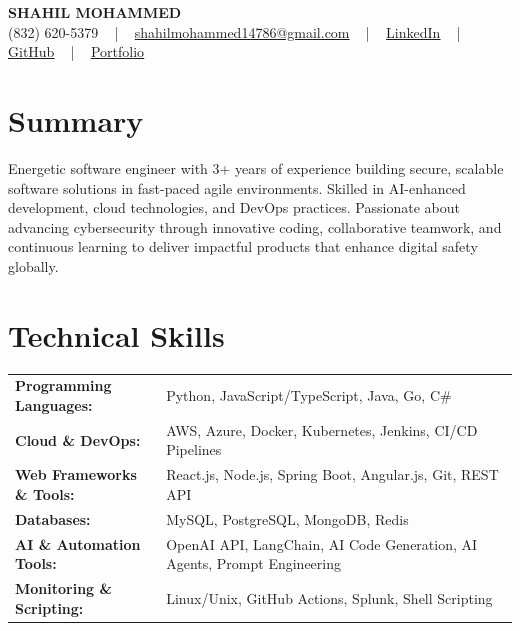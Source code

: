 \documentclass[letterpaper,11pt]{article}
\begin{document}
\begin{center}
    {\fontsize{14pt}{12pt}\selectfont \textbf{\MakeUppercase{Shahil Mohammed}}}\\ \vspace{2pt}
    \fontsize{10pt}{12pt}\selectfont (832) 620-5379 ~ | ~ \href{mailto:shahilmohammed14786@gmail.com}{shahilmohammed14786@gmail.com} ~ | ~  
    \href{https://www.linkedin.com/in/shahil-mohammed-9652931a1/}{\color{blue}\underline{LinkedIn}}  ~ | ~ 
    \href{https://github.com/freakbeast14}{\color{blue}\underline{GitHub}} ~ | ~ 
    \href{https://shahil-mohammed.netlify.app/}{\color{blue}\underline{Portfolio}}
    \vspace{-8pt}
\end{center}

\section{Summary}
\fontsize{9pt}{10pt}\selectfont
Energetic software engineer with 3+ years of experience building secure, scalable software solutions in fast-paced agile environments. Skilled in AI-enhanced development, cloud technologies, and DevOps practices. Passionate about advancing cybersecurity through innovative coding, collaborative teamwork, and continuous learning to deliver impactful products that enhance digital safety globally.
 \vspace{-5pt}
 
\section{Technical Skills}
        \vspace{-14pt}
        \begin{table}[h]
            \fontsize{9pt}{10pt}\selectfont
            \begin{tabular}{p{0.3\linewidth} p{0.7\linewidth}}
                \textbf{Programming Languages:} & Python, JavaScript/TypeScript, Java, Go, C\# \\
                \textbf{Cloud \& DevOps:} & AWS, Azure, Docker, Kubernetes, Jenkins, CI/CD Pipelines \\
                \textbf{Web Frameworks \& Tools:} & React.js, Node.js, Spring Boot, Angular.js, Git, REST API \\
                \textbf{Databases:} & MySQL, PostgreSQL, MongoDB, Redis \\
                \textbf{AI \& Automation Tools:} & OpenAI API, LangChain, AI Code Generation, AI Agents, Prompt Engineering \\
                \textbf{Monitoring \& Scripting:} & Linux/Unix, GitHub Actions, Splunk, Shell Scripting \\
            \end{tabular}
        \end{table}
 \vspace{-15pt}
 
\end{document}
